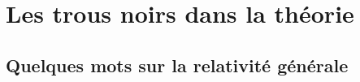 \section{Les trous noirs dans la théorie}

\subsection{Quelques mots sur la relativité générale}
%
%
%	
%  
%
%
%	
%
%
%	
%
%

